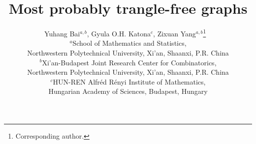 \documentclass[11pt,a4paper]{article}
\begin{document}
\title{\bf\Large Most probably trangle-free graphs %
}
\date{}
\author{Yuhang Bai$^{a,b}$,  Gyula O.H. Katona$^{c}$, Zixuan Yang$^{a,b}$\thanks{Corresponding author.}
~\\[2mm]
\small $^{a}$School of Mathematics and Statistics, \\
\small Northwestern Polytechnical University, Xi'an, Shaanxi, P.R. China\\
\small $^{b}$Xi'an-Budapest Joint Research Center for Combinatorics, \\
\small Northwestern Polytechnical University, Xi'an, Shaanxi, P.R. China\\
\small $^{c}$HUN-REN Alfréd Rényi Institute of Mathematics, \\
\small Hungarian Academy of Sciences, Budapest, Hungary\\
}
\maketitle
\end{document}
